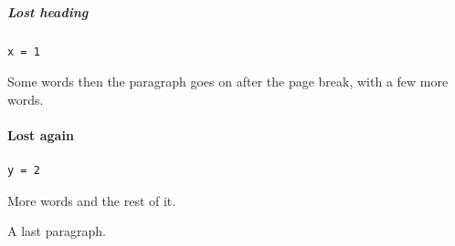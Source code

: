 \documentclass[11pt]{report}
\begin{document}
\subparagraph{Lost heading}
\begin{lstlisting}
x = 1
\end{lstlisting}
Some words \clearpage then the paragraph goes on after the page break, with a few more words.

\paragraph{Lost again}
\begin{lstlisting}
y = 2
\end{lstlisting}
More words \newpage and the rest of it.

\newpage
A last paragraph.
\end{document}
